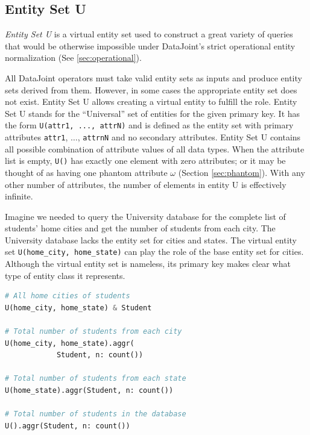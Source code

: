 \documentclass[letter,10pt]{article}
\newcommand{\datajoint}{DataJoint\xspace}
\begin{document}
\subsection{Entity Set U}\label{sec:u}
\emph{Entity Set U} is a virtual entity set used to construct a great variety of queries that would be otherwise impossible under \datajoint's strict operational entity normalization (See \ref{sec:operational}).

All \datajoint operators must take valid entity sets as inputs and produce entity sets derived from them.  
However, in some cases the appropriate entity set does not exist.  
Entity Set U allows creating a virtual entity to fulfill the role.
Entity Set U stands for the ``Universal'' set of entities for the given primary key.
It has the form \lstinline$U(attr1, ..., attrN)$ and is defined as the entity set with primary attributes \lstinline$attr1$, $\ldots$, \lstinline$attrnN$ and no secondary attributes.
Entity Set U contains all possible combination of attribute values of all data types.
When the attribute list is empty, \lstinline$U()$ has exactly one element with zero attributes; or it may be thought of as having one phantom attribute $\omega$ (Section \ref{sec:phantom}).
With any other number of attributes, the number of elements in entity U is effectively infinite.

Imagine we needed to query the University database for the complete list of students' home cities and get the number of students from each city.
The University database lacks the entity set for cities and states. 
The virtual entity set \lstinline$U(home_city, home_state)$ can play the role of the base entity set for cities.
Although the virtual entity set is nameless, its primary key makes clear what type of entity class it represents.

\begin{lstlisting}[language=Python, morekeywords={avg, U}, caption={Creating a new entity.}, label={lst:city}]
# All home cities of students 
U(home_city, home_state) & Student 

# Total number of students from each city
U(home_city, home_state).aggr(
            Student, n: count())

# Total number of students from each state
U(home_state).aggr(Student, n: count())

# Total number of students in the database
U().aggr(Student, n: count())
\end{lstlisting}
\end{document}

